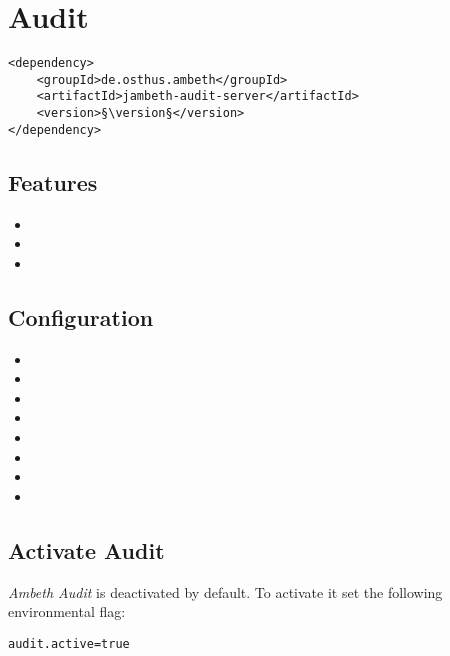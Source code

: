 \section{Audit}
\label{module:Audit}
\ClearAPI
\begin{lstlisting}[style=POM,caption={Maven modules to use \emph{Ambeth Audit}}]
<dependency>
	<groupId>de.osthus.ambeth</groupId>
	<artifactId>jambeth-audit-server</artifactId>
	<version>§\version§</version>
</dependency>
\end{lstlisting}
\TODO
\subsection{Features}
\begin{itemize}
	\item {}
	\item {}
	\item {}
\end{itemize}

\subsection{Configuration}
\begin{itemize}
	\item {}
	\item {}
	\item {}
	\item {}
	\item {}
	\item {}
	\item {}
	\item {}
\end{itemize}

\subsection{Activate Audit}
\textit{Ambeth Audit} is deactivated by default. To activate it set the following environmental flag:
\begin{lstlisting}[style=Props]
audit.active=true
\end{lstlisting}

